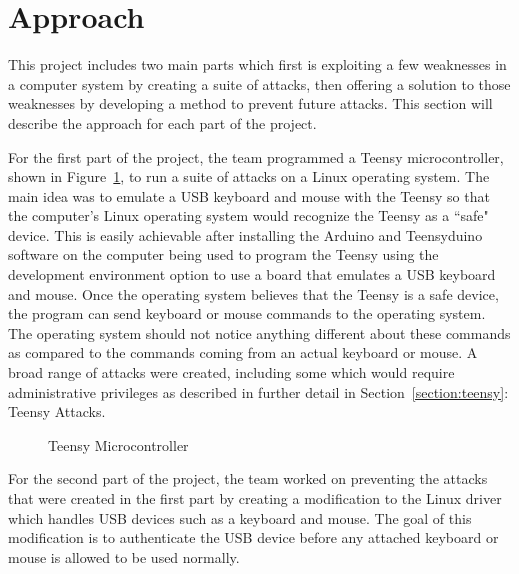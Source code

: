 \documentclass[pagenumbers]{ieee}
\begin{document}
\section{Approach}
\label{section:approach}

This project includes two main parts which first is exploiting a few weaknesses in a computer system by creating a suite of attacks, then offering a solution to those weaknesses by developing a method to prevent future attacks. This section will describe the approach for each part of the project.

For the first part of the project, the team programmed a Teensy microcontroller, shown in Figure~\ref{fig:Teensy}, to run a suite of attacks on a Linux operating system. The main idea was to emulate a USB keyboard and mouse with the Teensy so that the computer's Linux operating system would recognize the Teensy as a ``safe" device. This is easily achievable after installing the Arduino and Teensyduino software on the computer being used to program the Teensy using the development environment option to use a board that emulates a USB keyboard and mouse. Once the operating system believes that the Teensy is a safe device, the program can send keyboard or mouse commands to the operating system. The operating system should not notice anything different about these commands as compared to the commands coming from an actual keyboard or mouse. A broad range of attacks were created, including some which would require administrative privileges as described in further detail in Section~\ref{section:teensy}: Teensy Attacks.

\begin{figure}[H]
   \caption{Teensy Microcontroller}
   \label{fig:Teensy}
\end{figure}

For the second part of the project, the team worked on preventing the attacks that were created in the first part by creating a modification to the Linux driver which handles USB devices such as a keyboard and mouse. The goal of this modification is to authenticate the USB device before any attached keyboard or mouse is allowed to be used normally.
\end{document}
